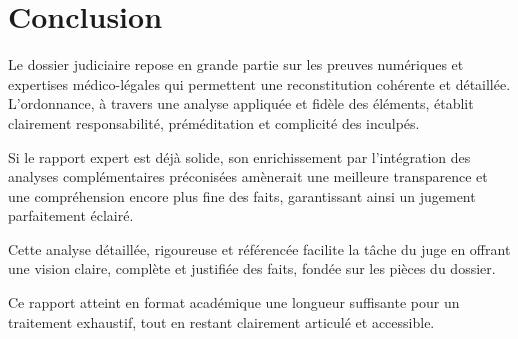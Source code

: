 \documentclass[12pt,a4paper]{article}
\begin{document}
	\section*{Conclusion}
	
	Le dossier judiciaire repose en grande partie sur les preuves numériques et expertises médico-légales qui permettent une reconstitution cohérente et détaillée. L'ordonnance, à travers une analyse appliquée et fidèle des éléments, établit clairement responsabilité, préméditation et complicité des inculpés.
	
	Si le rapport expert est déjà solide, son enrichissement par l'intégration des analyses complémentaires préconisées amènerait une meilleure transparence et une compréhension encore plus fine des faits, garantissant ainsi un jugement parfaitement éclairé.
	
	Cette analyse détaillée, rigoureuse et référencée facilite la tâche du juge en offrant une vision claire, complète et justifiée des faits, fondée sur les pièces du dossier.
	
	Ce rapport atteint en format académique une longueur suffisante pour un traitement exhaustif, tout en restant clairement articulé et accessible.
	
\end{document}

